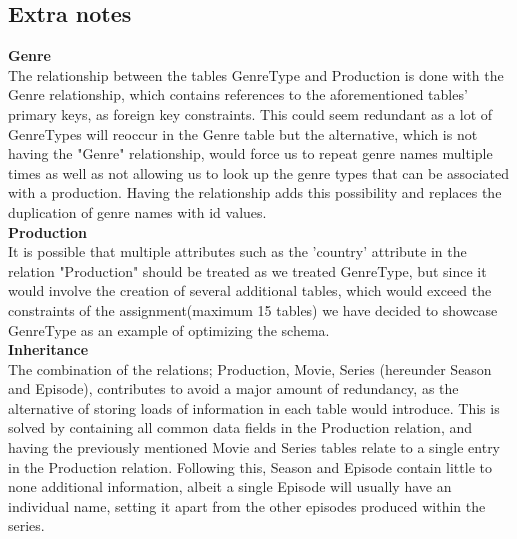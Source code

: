 \subsection{Extra notes}
\large\textbf{Genre}\\\normalsize
The relationship between the tables GenreType and Production is done with the Genre relationship, which contains references to the aforementioned tables' primary keys, as foreign key constraints. This could seem redundant as a lot of GenreTypes will reoccur in the Genre table but the alternative, which is not having the "Genre" relationship, would force us to repeat genre names multiple times as well as not allowing us to look up the genre types that can be associated with a production. Having the relationship adds this possibility and replaces the duplication of genre names with id values.\\
\newline
\large\textbf{Production}\\\normalsize
It is possible that multiple attributes such as the 'country' attribute in the relation "Production" should be treated as we treated GenreType, but since it would involve the creation of several additional tables, which would exceed the constraints of the assignment(maximum 15 tables) we have decided to showcase GenreType as an example of optimizing the schema.\\
\newline
\large\textbf{Inheritance}\\\normalsize
The combination of the relations; Production, Movie, Series (hereunder Season and Episode), contributes to avoid a major amount of redundancy, as the alternative of storing loads of information in each table would introduce. This is solved by containing all common data fields in the Production relation, and having the previously mentioned Movie and Series tables relate to a single entry in the Production relation. Following this, Season and Episode contain little to none additional information, albeit a single Episode will usually have an individual name, setting it apart from the other episodes produced within the series.